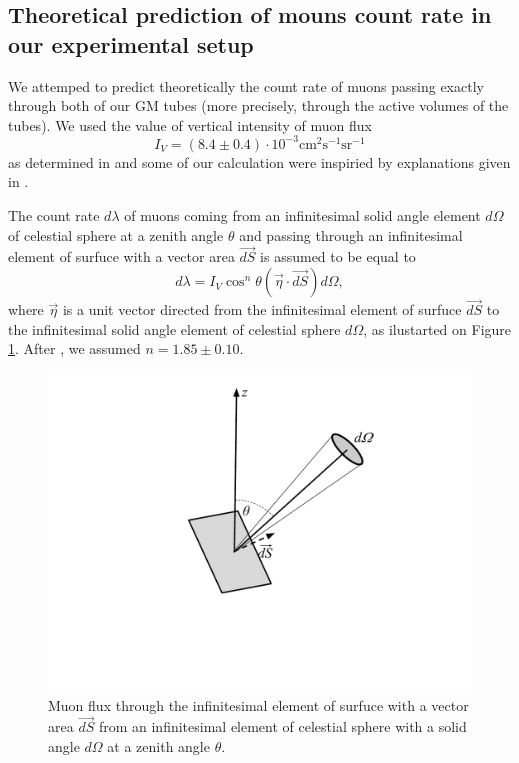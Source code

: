 \documentclass[main.tex]{subfiles}
\begin{document}
\subsection{Theoretical prediction of mouns count rate in our experimental setup}
\label{theoretical_muon_count_rate}

We attemped to predict theoretically the count rate of muons passing exactly through both of our GM tubes (more precisely, through the active volumes of the tubes). We used the value of vertical
intensity of muon flux 
\begin{equation}
I_V=(8.4\pm 0.4)\cdot 10^{-3} \text{cm}^2\text{s}^{-1}\text{sr}^{-1}
\end{equation} 
as determined in \cite{dragic2008} and some of our calculation were inspiried by explanations given in \cite{kuo2010}.

The count rate $d\lambda$ of muons coming from an infinitesimal solid angle element $d\Omega$ of celestial sphere at a zenith angle $\theta$ and passing through an infinitesimal element of surfuce with a vector area $\vec{dS}$ is assumed to be equal to 
\begin{equation}
d\lambda = I_V\cos^n\theta (\vec{\eta}\cdot \vec{dS})d\Omega,
\end{equation}
where $\vec{\eta}$ is a unit vector directed from the infinitesimal element of surfuce $\vec{dS}$ to the infinitesimal solid angle element of celestial sphere $d\Omega$, as ilustarted on Figure \ref{fig:muon_flux}. After \cite{dragic2008}, we assumed $n=1.85\pm0.10$.
\begin{figure}[H]

\centering
\includegraphics[scale=0.5]{figs/MuonFlux}
\caption{Muon flux through the infinitesimal element of surfuce with a vector area $\vec{dS}$ from an infinitesimal element of celestial sphere with a solid angle $d\Omega$ at a zenith angle $\theta$.}
\label{fig:muon_flux}
\end{figure} 
\end{document}
